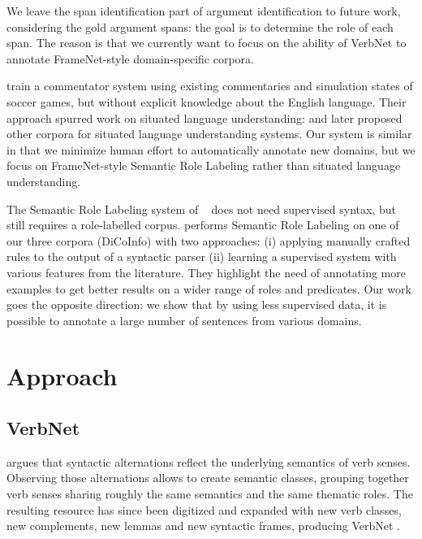 We leave the span identification part of argument identification to future
work, considering the gold argument spans: the goal is to determine the role of
each span. The reason is that we currently want to focus on the ability of
VerbNet to annotate FrameNet-style domain-specific corpora.

\cite{chen2008learning} train a commentator system using
existing commentaries and simulation states of soccer games, but without
explicit knowledge about the English language. Their approach spurred work on
situated language understanding: \cite{bordes2010towards}
and \cite{richardson2012towards} later proposed other
corpora for situated language understanding systems. Our system is similar in
that we minimize human effort to automatically annotate new domains, but we
focus on FrameNet-style Semantic Role Labeling rather than situated language
understanding.

The Semantic Role Labeling system of ~\cite{gormley2014low}
does not need supervised syntax, but still requires a role-labelled corpus.
\cite{hadouche2011annotation} performs Semantic Role Labeling on
one of our three corpora (DiCoInfo) with two approaches: (i) applying manually
crafted rules to the output of a syntactic parser (ii) learning a supervised
system with various features from the literature. They highlight the need
of annotating more examples to get better results on a wider range of roles and
predicates. Our work goes the opposite direction: we show that by using less
supervised data, it is possible to annotate a large number of sentences from
various domains.

\section{Approach}

\subsection{VerbNet}
\label{subsec:verbnet}

\cite{levin1993english} argues that syntactic alternations reflect the
underlying semantics of verb senses. Observing those alternations allows to
create semantic classes, grouping together verb senses sharing roughly the same
semantics and the same thematic roles. The resulting resource has since been
digitized and expanded with new verb classes, new complements, new lemmas and
new syntactic frames, producing VerbNet \cite{kipperschuler2005verbnet}.

